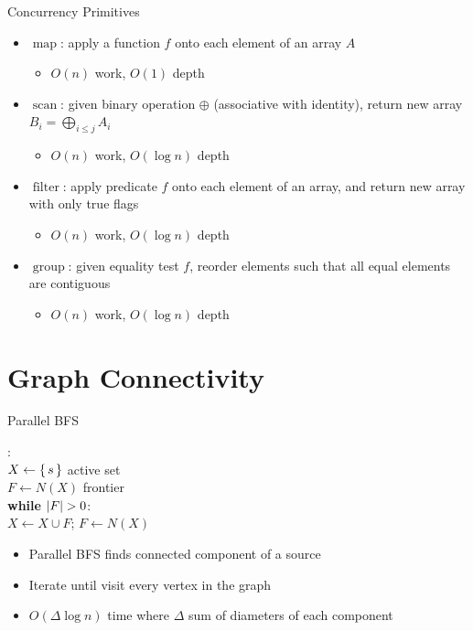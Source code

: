 \documentclass[aspectratio=169]{beamer}
\newcommand{\pauseitem}{\onslide<+-> \item}
\DeclareMathOperator{\pmap}{map}
\DeclareMathOperator{\pscan}{scan}
\DeclareMathOperator{\pfilt}{filter}
\DeclareMathOperator{\pgroup}{group}
\begin{document}
\begin{frame}{Concurrency Primitives}
    \begin{itemize}
        \pauseitem $\pmap$: apply a function $f$ onto each element of an array $A$
        \begin{itemize}
            \pauseitem $O(n)$ work, $O(1)$ depth
        \end{itemize}
        \pauseitem $\pscan$: given binary operation $\oplus$ (associative with identity), return new array $B_i = \bigoplus_{i \le j} A_i$
        \begin{itemize}
            \pauseitem $O(n)$ work, $O(\log n)$ depth
        \end{itemize}
        \pauseitem $\pfilt$: apply predicate $f$ onto each element of an array, and return new array with only true flags
        \begin{itemize}
            \pauseitem $O(n)$ work, $O(\log n)$ depth
        \end{itemize}
        \pauseitem $\pgroup$: given equality test $f$, reorder elements such that all equal elements are contiguous
        \begin{itemize}
            \pauseitem $O(n)$ work, $O(\log n)$ depth 
        \end{itemize}
    \end{itemize}
\end{frame}

\section{Graph Connectivity}
\frame{\tableofcontents[currentsection]}

\begin{frame}{Parallel BFS}
    \begin{algo}
        : \+
        \\ $X \gets \set{s}$ active set
        \\ $F \gets N(X)$ frontier
        \\ \textbf{while} $\abs{F} > 0$:
        \+ \\ $X \gets X \cup F$; $F \gets N(X)$ \-
    \end{algo}
    \vspace{\baselineskip}

    \begin{itemize}
        \pauseitem Parallel BFS finds connected component of a source
        \pauseitem Iterate until visit every vertex in the graph
        \pauseitem $O(\Delta \log n)$ time where $\Delta$ sum of diameters of each component
    \end{itemize}
\end{frame}
\end{document}
